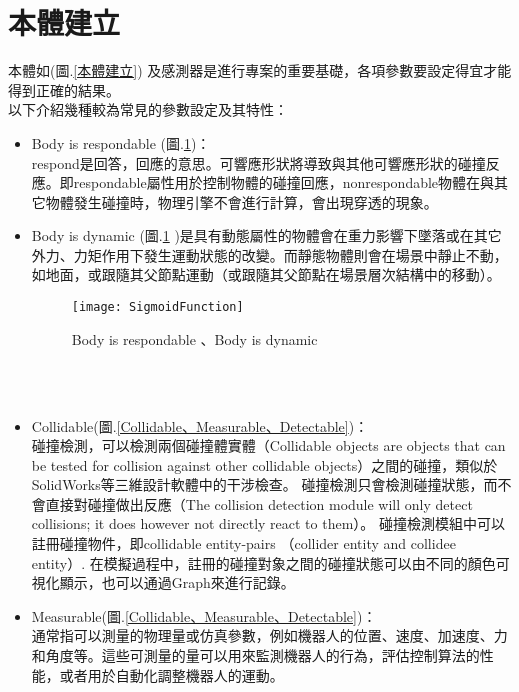 \section{本體建立}
本體如(圖.\ref{本體建立}) 及感測器是進行專案的重要基礎，各項參數要設定得宜才能得到正確的結果。\\
以下介紹幾種較為常見的參數設定及其特性：
\begin{itemize}
\item Body is respondable (圖.\ref{Body is respondable 、Body is dynamic})：\\
respond是回答，回應的意思。可響應形狀將導致與其他可響應形狀的碰撞反應。即respondable屬性用於控制物體的碰撞回應，nonrespondable物體在與其它物體發生碰撞時，物理引擎不會進行計算，會出現穿透的現象。

\item Body is dynamic (圖.\ref{Body is respondable 、Body is dynamic} )是具有動態屬性的物體會在重力影響下墜落或在其它外力、力矩作用下發生運動狀態的改變。而靜態物體則會在場景中靜止不動，如地面，或跟隨其父節點運動（或跟隨其父節點在場景層次結構中的移動）。\\
\begin{figure}[hbt!]
\begin{center}
\texttt{[image: SigmoidFunction]}
\caption{\Large Body is respondable 、Body is dynamic}\label{Body is respondable 、Body is dynamic}
\end{center}
\end{figure}
\\
\\
\item Collidable(圖.\ref{Collidable、Measurable、Detectable})：\\
碰撞檢測，可以檢測兩個碰撞體實體（Collidable objects are objects that can be tested for collision against other collidable objects）之間的碰撞，類似於SolidWorks等三維設計軟體中的干涉檢查。 碰撞檢測只會檢測碰撞狀態，而不會直接對碰撞做出反應（The collision detection module will only detect collisions; it does however not directly react to them）。 碰撞檢測模組中可以註冊碰撞物件，即collidable entity-pairs （collider entity and collidee entity）. 在模擬過程中，註冊的碰撞對象之間的碰撞狀態可以由不同的顏色可視化顯示，也可以通過Graph來進行記錄。
\item Measurable(圖.\ref{Collidable、Measurable、Detectable})：\\
通常指可以測量的物理量或仿真參數，例如機器人的位置、速度、加速度、力和角度等。這些可測量的量可以用來監測機器人的行為，評估控制算法的性能，或者用於自動化調整機器人的運動。\\

\end{itemize}
